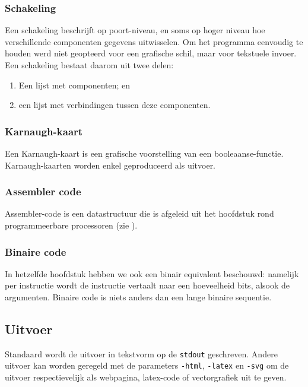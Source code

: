 \subsubsection{Schakeling}
Een schakeling beschrijft op poort-niveau, en soms op hoger niveau hoe verschillende componenten gegevens uitwisselen. Om het programma eenvoudig te houden werd niet geopteerd voor een grafische schil, maar voor tekstuele invoer. Een schakeling bestaat daarom uit twee delen:
\begin{enumerate}
 \item Een lijst met componenten; en
 \item een lijst met verbindingen tussen deze componenten.
\end{enumerate}

\subsubsection{Karnaugh-kaart}
Een Karnaugh-kaart is een grafische voorstelling van een booleaanse-functie. Karnaugh-kaarten worden enkel geproduceerd als uitvoer.
\subsubsection{Assembler code}
Assembler-code is een datastructuur die is afgeleid uit het hoofdstuk rond programmeerbare processoren (zie ).
\subsubsection{Binaire code}
In hetzelfde hoofdstuk hebben we ook een binair equivalent beschouwd: namelijk per instructie wordt de instructie vertaalt naar een hoeveelheid bits, alsook de argumenten. Binaire code is niets anders dan een lange binaire sequentie.
\subsection{Uitvoer}
Standaard wordt de uitvoer in tekstvorm op de \texttt{stdout} geschreven. Andere uitvoer kan worden geregeld met de parameters \texttt{-html}, \texttt{-latex} en \texttt{-svg} om de uitvoer respectievelijk als webpagina, latex-code of vectorgrafiek uit te geven.

